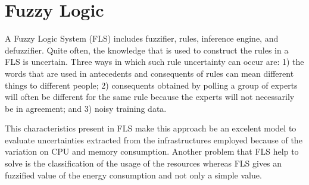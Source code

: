 \documentclass[runningheads,a4paper]{llncs}
\begin{document}
\section{Fuzzy Logic}\label{sec:fuzzy}

A Fuzzy Logic System (FLS) includes fuzzifier, rules, inference engine, and defuzzifier\cite{lianginterval}. Quite often, the knowledge that is used to construct the rules in a FLS is uncertain. Three ways in which such rule uncertainty can occur are: 1) the words that are used in antecedents and consequents of rules can mean different things to different people; 2) consequents obtained by polling a group of experts will often be different for the same rule because the experts will not necessarily be in agreement; and 3) noisy training data. \cite{1432675}

This characteristics present in FLS make this approach be an excelent model to evaluate uncertainties extracted from the infrastructures employed because of the variation on CPU and memory consumption. Another problem that FLS help to solve is the classification of the usage of the resources whereas FLS gives an fuzzified value of the energy consumption and not only a simple value.







\end{document}
